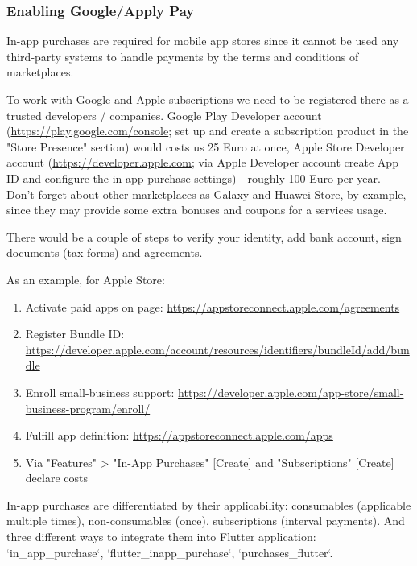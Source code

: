 \subsubsection{Enabling Google/Apply Pay}

In-app purchases are required for mobile app stores since it cannot be used any third-party systems to handle payments
by the terms and conditions of marketplaces.

To work with Google and Apple subscriptions we need to be registered there as a trusted developers / companies. Google 
Play Developer account (\href{https://play.google.com/console}{https://play.google.com/console}; set up and create a 
subscription product in the "Store Presence" section) would costs us 25 Euro at once, Apple Store Developer 
account (\href{https://developer.apple.com}{https://developer.apple.com}; via Apple Developer account create App ID and 
configure the in-app purchase settings) - roughly 100 Euro per year. Don't forget about other marketplaces as 
Galaxy and Huawei Store, by example, since they may provide some extra bonuses and coupons for a services usage.

There would be a couple of steps to verify your identity, add bank account, sign documents (tax forms) and agreements.

As an example, for Apple Store:
\begin{enumerate}
  \item Activate paid apps on page: \href{https://appstoreconnect.apple.com/agreements}{https://appstoreconnect.apple.com/agreements}
  \item Register Bundle ID: \href{https://developer.apple.com/account/resources/identifiers/bundleId/add/bundle}{https://developer.apple.com/account/resources/identifiers/bundleId/add/bundle}
  \item Enroll small-business support: \href{https://developer.apple.com/app-store/small-business-program/enroll/}{https://developer.apple.com/app-store/small-business-program/enroll/}
  \item Fulfill app definition: \href{https://appstoreconnect.apple.com/apps}{https://appstoreconnect.apple.com/apps}
  \item Via "Features" > "In-App Purchases" [Create] and "Subscriptions" [Create] declare costs
\end{enumerate}

In-app purchases are differentiated by their applicability: consumables (applicable multiple times), non-consumables 
(once), subscriptions (interval payments). And three different ways to integrate them into Flutter application:
`in\_app\_purchase`, `flutter\_inapp\_purchase`, `purchases\_flutter`.

